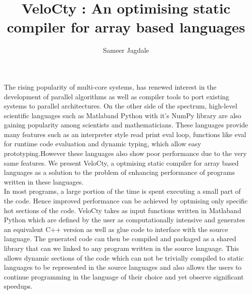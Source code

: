 \documentclass[a4paper, 12pt]{article}
\newcommand{\matlab}{{\textsc Matlab}\space}
\begin{document}
\title{VeloCty : An optimising static compiler for array based languages}
\author{Sameer Jagdale}
\maketitle
The rising popularity of multi-core systems, has renewed interest in the development of parallel algorithms as well as compiler tools to port existing systems to parallel architectures. On the other side of the spectrum, high-level scientific languages such as \matlab and Python with it's NumPy library are also gaining popularity among scientists and mathematicians. These languages provide many features such as an interpreter style read print eval loop, functions like eval for runtime code evaluation and dynamic typing, which allow easy prototyping.However these languages also show poor performance due to the very same features. We present VeloCty, a optmising static compiler for array based languages as a solution to the problem of enhancing performance of programs written in these languages. \\ 
In most programs, a large portion of the time is spent executing a small part of the code. Hence improved performance can be  achieved by optmising only specific hot sections of the code. VeloCty takes as input functions written in \matlab and Python which are defined by the user as computationally intensive and generates an equivalent C++ version as well as glue code to interface with the source language. The generated code can then be compiled and packaged as a shared library that can we linked to any program written in the source language. This allows dynamic sections of the code which can not be trivially compiled to static languages to be represented in the source languages and also allows the users to continue programming in the language of their choice and yet observe significant speedups. 
\end{document}
